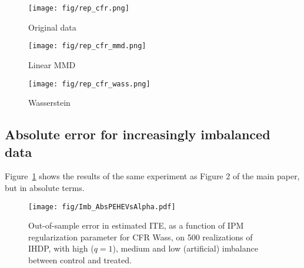 \documentclass{article}
\begin{document}
\begin{figure*}[]
  \centering
  \begin{subfigure}[b]{0.3\textwidth}
    \centering
    \texttt{[image: fig/rep\_cfr.png]}
    \caption{Original data}
  \end{subfigure}
  \begin{subfigure}[b]{0.3\textwidth}
    \centering
    \texttt{[image: fig/rep\_cfr\_mmd.png]}
    \caption{Linear MMD}
  \end{subfigure}
  \begin{subfigure}[b]{0.3\textwidth}
    \centering
    \texttt{[image: fig/rep\_cfr\_wass.png]}
    \caption{Wasserstein}
  \end{subfigure}
  \caption{\label{fig:reps}t-SNE visualizations of the balanced representations of IHDP learned by our algorithms CFR, CFR MMD and CFR Wass. We note that the nearest-neighbor like quality of the Wasserstein distance results in a strip-like representation, whereas the linear MMD results in a ball-like shape in regions where overlap is small.}
\end{figure*}

\subsection{Absolute error for increasingly imbalanced data}
Figure~\ref{fig:ihdp_abs_imb} shows the results of the same experiment as Figure 2 of the main paper, but in absolute terms.
\begin{figure}[t]
  \centering
  \texttt{[image: fig/Imb\_AbsPEHEVsAlpha.pdf]}\vspace{-1em}
  \caption{\label{fig:ihdp_abs_imb}Out-of-sample error in estimated ITE, as a function of IPM regularization parameter for CFR Wass, on 500 realizations of IHDP, with high ($q=1$), medium and low (artificial) imbalance between control and treated. }
  \vspace{-1em}
\end{figure}



 
\end{document}
